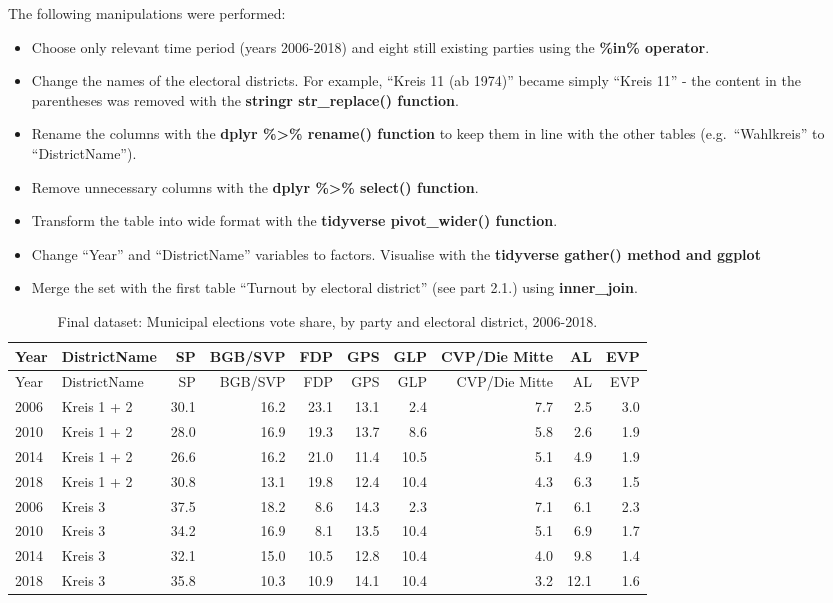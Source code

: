 \documentclass[
]{article}
\providecommand{\tightlist}{%
  \setlength{\itemsep}{0pt}\setlength{\parskip}{0pt}}
\begin{document}
The following manipulations were performed:

\begin{itemize}
\tightlist
\item
  Choose only relevant time period (years 2006-2018) and eight still
  existing parties using the \textbf{\%in\% operator}.
\item
  Change the names of the electoral districts. For example, ``Kreis 11
  (ab 1974)'' became simply ``Kreis 11'' - the content in the
  parentheses was removed with the \textbf{stringr str\_replace()
  function}.
\item
  Rename the columns with the \textbf{dplyr \%\textgreater\% rename()
  function} to keep them in line with the other tables
  (e.g.~``Wahlkreis'' to ``DistrictName'').
\item
  Remove unnecessary columns with the \textbf{dplyr \%\textgreater\%
  select() function}.
\item
  Transform the table into wide format with the \textbf{tidyverse
  pivot\_wider() function}.
\item
  Change ``Year'' and ``DistrictName'' variables to factors. Visualise
  with the \textbf{tidyverse gather() method and ggplot}
\item
  Merge the set with the first table ``Turnout by electoral district''
  (see part 2.1.) using \textbf{inner\_join}.
\end{itemize}

\begin{longtable}[]{@{}llrrrrrrrr@{}}
\caption{Final dataset: Municipal elections vote share, by party and
electoral district, 2006-2018.}\tabularnewline
\toprule
Year & DistrictName & SP & BGB/SVP & FDP & GPS & GLP & CVP/Die Mitte &
AL & EVP\tabularnewline
\midrule
\endfirsthead
\toprule
Year & DistrictName & SP & BGB/SVP & FDP & GPS & GLP & CVP/Die Mitte &
AL & EVP\tabularnewline
\midrule
\endhead
2006 & Kreis 1 + 2 & 30.1 & 16.2 & 23.1 & 13.1 & 2.4 & 7.7 & 2.5 &
3.0\tabularnewline
2010 & Kreis 1 + 2 & 28.0 & 16.9 & 19.3 & 13.7 & 8.6 & 5.8 & 2.6 &
1.9\tabularnewline
2014 & Kreis 1 + 2 & 26.6 & 16.2 & 21.0 & 11.4 & 10.5 & 5.1 & 4.9 &
1.9\tabularnewline
2018 & Kreis 1 + 2 & 30.8 & 13.1 & 19.8 & 12.4 & 10.4 & 4.3 & 6.3 &
1.5\tabularnewline
2006 & Kreis 3 & 37.5 & 18.2 & 8.6 & 14.3 & 2.3 & 7.1 & 6.1 &
2.3\tabularnewline
2010 & Kreis 3 & 34.2 & 16.9 & 8.1 & 13.5 & 10.4 & 5.1 & 6.9 &
1.7\tabularnewline
2014 & Kreis 3 & 32.1 & 15.0 & 10.5 & 12.8 & 10.4 & 4.0 & 9.8 &
1.4\tabularnewline
2018 & Kreis 3 & 35.8 & 10.3 & 10.9 & 14.1 & 10.4 & 3.2 & 12.1 &
1.6\tabularnewline
\bottomrule
\end{longtable}
\end{document}

